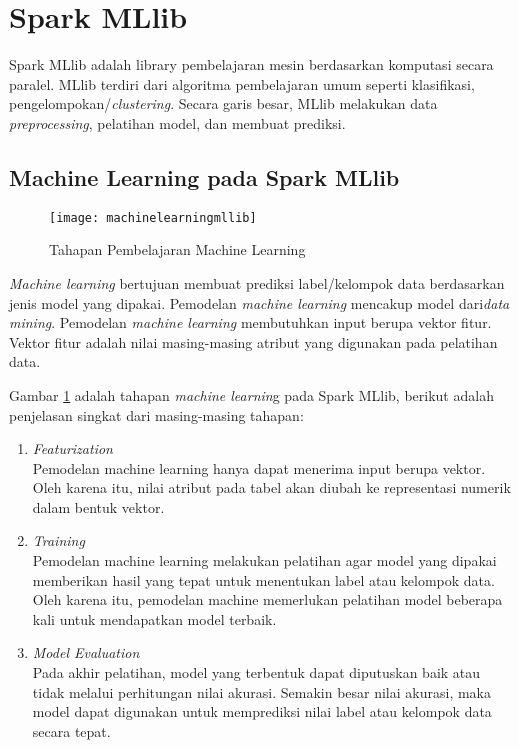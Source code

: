 \section{Spark MLlib}
\label{sec:konsep_spark_mllib}
Spark MLlib adalah library pembelajaran mesin berdasarkan komputasi secara paralel. MLlib terdiri dari algoritma pembelajaran umum seperti klasifikasi, pengelompokan/\textit{clustering}. Secara garis besar, MLlib melakukan data \textit{preprocessing}, pelatihan model, dan membuat prediksi.

\subsection{Machine Learning pada Spark MLlib}
\label{sec:ml_sparkmllib}
\begin{figure}[H]
	\centering
	\texttt{[image: machinelearningmllib]}
	\caption{Tahapan Pembelajaran Machine Learning}
	\label{fig:machinelearningmllib}
\end{figure}

\textit{Machine learning} bertujuan membuat prediksi label/kelompok data berdasarkan jenis model yang dipakai. Pemodelan \textit{machine learning} mencakup model dari\textit{data mining}. Pemodelan \textit{machine learning} membutuhkan input berupa vektor fitur. Vektor fitur adalah nilai masing-masing atribut yang digunakan pada pelatihan data. 

\noindent Gambar \ref{fig:machinelearningmllib} adalah tahapan \textit{machine learnin}g pada Spark MLlib, berikut adalah penjelasan singkat dari masing-masing tahapan:

\begin{enumerate}

\item \textit{Featurization}\\
Pemodelan machine learning hanya dapat menerima input berupa vektor. Oleh karena itu, nilai atribut pada tabel akan diubah ke representasi numerik dalam bentuk vektor. 
 
\item \textit{Training}\\
Pemodelan machine learning melakukan pelatihan agar model yang dipakai memberikan hasil yang tepat untuk menentukan label atau kelompok data. Oleh karena itu, pemodelan machine memerlukan pelatihan model beberapa kali untuk mendapatkan model terbaik.

\item \textit{Model Evaluation}\\
Pada akhir pelatihan, model yang terbentuk dapat diputuskan baik atau tidak melalui perhitungan nilai akurasi. Semakin besar nilai akurasi, maka model dapat digunakan untuk memprediksi nilai label atau kelompok data secara tepat.
\end{enumerate}


